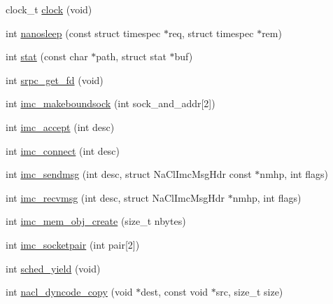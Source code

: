 \begin{DoxyCompactItemize}
clock\_\-t \hyperlink{group__syscalls_gade863cfcca9ee19f20ca95796f8ddc1e}{clock} (void)
\item 
int \hyperlink{group__syscalls_ga1b63fa141b202a0b01cfef8421aa48d6}{nanosleep} (const struct timespec $\ast$req, struct timespec $\ast$rem)
\item 
int \hyperlink{group__syscalls_ga3dc1b07404b646712a144e2057359876}{stat} (const char $\ast$path, struct stat $\ast$buf)
\item 
int \hyperlink{group__syscalls_ga09d2f0c23245cbe6d78e532bbb7644a0}{srpc\_\-get\_\-fd} (void)
\item 
int \hyperlink{group__syscalls_ga860564306c0be29e7894d9633f866ab8}{imc\_\-makeboundsock} (int sock\_\-and\_\-addr\mbox{[}2\mbox{]})
\item 
int \hyperlink{group__syscalls_gab16585276c20a165a3b70df3eb7b21b8}{imc\_\-accept} (int desc)
\item 
int \hyperlink{group__syscalls_ga8d0d3a853d9db5850b9996111a81455c}{imc\_\-connect} (int desc)
\item 
int \hyperlink{group__syscalls_gaeebbaffd8770c75e4cd8648621dc2e77}{imc\_\-sendmsg} (int desc, struct NaClImcMsgHdr const $\ast$nmhp, int flags)
\item 
int \hyperlink{group__syscalls_gac935e49fda12e4f012fcb9eea3475f5c}{imc\_\-recvmsg} (int desc, struct NaClImcMsgHdr $\ast$nmhp, int flags)
\item 
int \hyperlink{group__syscalls_ga182a6da37d09ec51dcd181dd5a393fba}{imc\_\-mem\_\-obj\_\-create} (size\_\-t nbytes)
\item 
int \hyperlink{group__syscalls_ga80848569a6564f83a78a2975af2e621f}{imc\_\-socketpair} (int pair\mbox{[}2\mbox{]})
\item 
int \hyperlink{group__syscalls_ga357cd4b34c13011749dfffb42b489f09}{sched\_\-yield} (void)
\item 
int \hyperlink{group__syscalls_ga0767bb3577482bd018fad742f12fd35a}{nacl\_\-dyncode\_\-copy} (void $\ast$dest, const void $\ast$src, size\_\-t size)
\end{DoxyCompactItemize}


